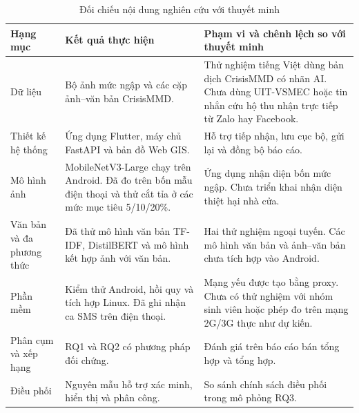 \begin{table}[H]
\centering
\caption{Đối chiếu nội dung nghiên cứu với thuyết minh}
\label{tab:proposal-map}
\begin{tabular}{P{.18\textwidth}P{.39\textwidth}P{.34\textwidth}}
\toprule Hạng mục & Kết quả thực hiện & Phạm vi và chênh lệch so với thuyết minh \\\midrule
Dữ liệu & Bộ ảnh mức ngập và các cặp ảnh--văn bản CrisisMMD. & Thử nghiệm tiếng Việt dùng bản dịch CrisisMMD có nhãn AI. Chưa dùng UIT-VSMEC hoặc tin nhắn cứu hộ thu nhận trực tiếp từ Zalo hay Facebook. \\
Thiết kế hệ thống & Ứng dụng Flutter, máy chủ FastAPI và bản đồ Web GIS. & Hỗ trợ tiếp nhận, lưu cục bộ, gửi lại và đồng bộ báo cáo. \\
Mô hình ảnh & MobileNetV3-Large chạy trên Android. Đã đo trên bốn mẫu điện thoại và thử cắt tỉa ở các mức mục tiêu 5/10/20\%. & Ứng dụng nhận diện bốn mức ngập. Chưa triển khai nhận diện thiệt hại nhà cửa. \\
Văn bản và đa phương thức & Đã thử mô hình văn bản TF-IDF, DistilBERT và mô hình kết hợp ảnh với văn bản. & Hai thử nghiệm ngoại tuyến. Các mô hình văn bản và ảnh--văn bản chưa tích hợp vào Android. \\
Phần mềm & Kiểm thử Android, hồi quy và tích hợp Linux. Đã ghi nhận ca SMS trên điện thoại. & Mạng yếu được tạo bằng proxy. Chưa có thử nghiệm với nhóm sinh viên hoặc phép đo trên mạng 2G/3G thực như dự kiến. \\
Phân cụm và xếp hạng & RQ1 và RQ2 có phương pháp đối chứng. & Đánh giá trên báo cáo bán tổng hợp và tổng hợp. \\
Điều phối & Nguyên mẫu hỗ trợ xác minh, hiển thị và phân công. & So sánh chính sách điều phối trong mô phỏng RQ3. \\
\bottomrule
\end{tabular}
\end{table}

